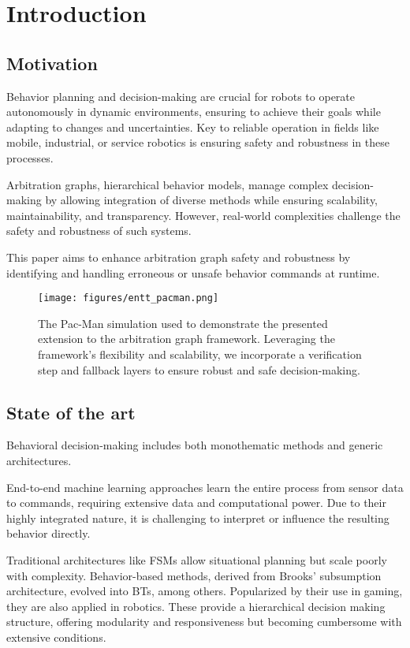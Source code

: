 \section{Introduction}

\subsection{Motivation}

Behavior planning and decision-making are crucial for robots to operate autonomously in dynamic environments, ensuring to achieve their goals while adapting to changes and uncertainties.
Key to reliable operation in fields like mobile, industrial, or service robotics is ensuring safety and robustness in these processes.

Arbitration graphs, hierarchical behavior models, manage complex decision-making
by allowing integration of diverse methods while ensuring scalability, maintainability, and transparency.
However, real-world complexities challenge the safety and robustness of such systems.

This paper aims to enhance arbitration graph safety and robustness by identifying and handling erroneous or unsafe behavior commands at runtime.

\begin{figure}
    \centering
    \texttt{[image: figures/entt\_pacman.png]}
    \caption{The Pac-Man simulation used to demonstrate the presented extension to the arbitration graph framework.
    Leveraging the framework's flexibility and scalability,
    we incorporate a verification step and fallback layers
    to ensure robust and safe decision-making.}
    \label{fig:entt-pacman}
\end{figure}

\subsection{State of the art}
Behavioral decision-making includes both monothematic methods and generic architectures.

End-to-end machine learning approaches learn the entire process from sensor data to commands, requiring extensive data and computational power.
Due to their highly integrated nature, it is challenging to interpret or influence the resulting behavior directly.

Traditional architectures like \glspl{FSM} allow situational planning but scale poorly with complexity. Behavior-based methods, derived from Brooks' subsumption architecture, evolved into \glspl{BT}, among others. Popularized by their use in gaming, they are also applied in robotics. These provide a hierarchical decision making structure, offering modularity and responsiveness but becoming cumbersome with extensive conditions.

